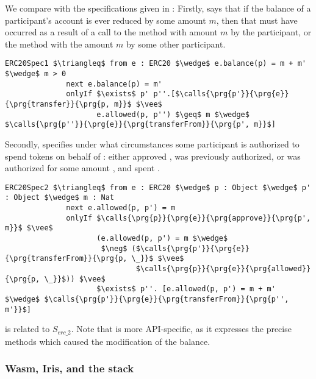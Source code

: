 \vspace{1cm}

We compare with the specifications given in \cite{OOPSLA22}:
 Firstly,  
says that if the balance of a participant's account is ever reduced by some amount $m$, then
that must have occurred as a result of a call to the  method with amount $m$ by the participant,
or the  method with the amount $m$ by some other participant.
\begin{lstlisting}[language = Chainmail, mathescape=true, frame=lines]
ERC20Spec1 $\triangleq$ from e : ERC20 $\wedge$ e.balance(p) = m + m' $\wedge$ m > 0
              next e.balance(p) = m'
              onlyIf $\exists$ p' p''.[$\calls{\prg{p'}}{\prg{e}}{\prg{transfer}}{\prg{p, m}}$ $\vee$ 
                     e.allowed(p, p'') $\geq$ m $\wedge$ $\calls{\prg{p''}}{\prg{e}}{\prg{transferFrom}}{\prg{p', m}}$]
\end{lstlisting}
Secondly,  specifies under what circumstances some participant  is authorized to 
spend  tokens on behalf of : either  approved ,  was previously authorized,
or  was authorized for some amount , and spent .
\begin{lstlisting}[language = Chainmail, mathescape=true, frame=lines]
ERC20Spec2 $\triangleq$ from e : ERC20 $\wedge$ p : Object $\wedge$ p' : Object $\wedge$ m : Nat
              next e.allowed(p, p') = m
              onlyIf $\calls{\prg{p}}{\prg{e}}{\prg{approve}}{\prg{p', m}}$ $\vee$ 
                     (e.allowed(p, p') = m $\wedge$ 
                      $\neg$ ($\calls{\prg{p'}}{\prg{e}}{\prg{transferFrom}}{\prg{p, \_}}$ $\vee$ 
                              $\calls{\prg{p}}{\prg{e}}{\prg{allowed}}{\prg{p, \_}}$)) $\vee$
                     $\exists$ p''. [e.allowed(p, p') = m + m' $\wedge$ $\calls{\prg{p'}}{\prg{e}}{\prg{transferFrom}}{\prg{p'', m'}}$]
\end{lstlisting}

 is related to $S_{erc\_2}$. Note that  is more API-specific, as it expresses the precise methods which caused the modification of the balance.

\subsubsection{Wasm, Iris, and the stack}

